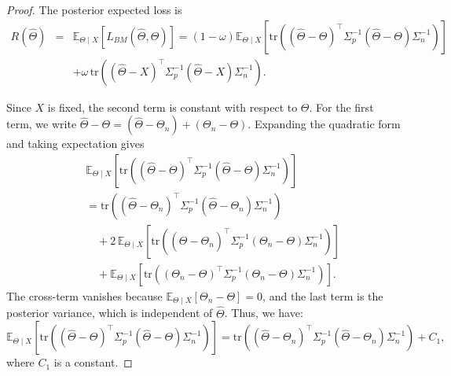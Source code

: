 \documentclass[twoside]{article}
\begin{document}
\begin{proof}
The posterior expected loss is
\begin{eqnarray*}
R(\hat{\Theta}) &=& \mathbb{E}_{\Theta \mid X}[L_{BM}(\hat{\Theta}, \Theta)] = (1-\omega) \mathbb{E}_{\Theta \mid X}\left[\mathrm{tr}\left((\hat{\Theta} - \Theta)^\top \Sigma_p^{-1} (\hat{\Theta} - \Theta) \Sigma_n^{-1}\right)\right] \\
&&+ \omega \, \mathrm{tr}\left((\hat{\Theta} - X)^\top \Sigma_p^{-1} (\hat{\Theta} - X) \Sigma_n^{-1}\right).
\end{eqnarray*}

Since $X$ is fixed, the second term is constant with respect to $\Theta$. For the first term, we write $\hat{\Theta} - \Theta = (\hat{\Theta} - \Theta_n) + (\Theta_n - \Theta)$. Expanding the quadratic form and taking expectation gives
\begin{eqnarray*}
&&\mathbb{E}_{\Theta \mid X}\left[\mathrm{tr}\left((\hat{\Theta} - \Theta)^\top \Sigma_p^{-1} (\hat{\Theta} - \Theta) \Sigma_n^{-1}\right)\right] \\
&& =\mathrm{tr}\left((\hat{\Theta} - \Theta_n)^\top \Sigma_p^{-1} (\hat{\Theta} - \Theta_n) \Sigma_n^{-1}\right) \\
&& \quad + 2 \, \mathbb{E}_{\Theta \mid X}\left[\mathrm{tr}\left((\hat{\Theta} - \Theta_n)^\top \Sigma_p^{-1} (\Theta_n - \Theta) \Sigma_n^{-1}\right)\right] \\
&& \quad + \mathbb{E}_{\Theta \mid X}\left[\mathrm{tr}\left((\Theta_n - \Theta)^\top \Sigma_p^{-1} (\Theta_n - \Theta) \Sigma_n^{-1}\right)\right].
\end{eqnarray*}
The cross-term vanishes because $\mathbb{E}_{\Theta \mid X}[\Theta_n - \Theta] = 0$, and the last term is the posterior variance, which is independent of $\hat{\Theta}$. Thus, we have:
\[
\mathbb{E}_{\Theta \mid X}\left[\mathrm{tr}\left((\hat{\Theta} - \Theta)^\top \Sigma_p^{-1} (\hat{\Theta} - \Theta) \Sigma_n^{-1}\right)\right] = \mathrm{tr}\left((\hat{\Theta} - \Theta_n)^\top \Sigma_p^{-1} (\hat{\Theta} - \Theta_n) \Sigma_n^{-1}\right) + C_1,
\]
where $C_1$ is a constant.


\end{proof}
\end{document}
